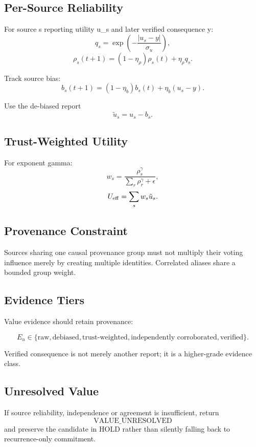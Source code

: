 

\subsection{Per-Source Reliability}

For source s reporting utility u_s and later verified consequence y:
\[
q_s = \exp\left(-\frac{|u_s-y|}{\sigma_u}\right),
\]
\[
\rho_s(t+1)
=
(1-\eta_\rho)\rho_s(t)
+
\eta_\rho q_s.
\]

Track source bias:
\[
b_s(t+1)
=
(1-\eta_b)b_s(t)
+
\eta_b(u_s-y).
\]

Use the de-biased report
\[
\tilde u_s=u_s-b_s.
\]

\subsection{Trust-Weighted Utility}

For exponent gamma:
\[
w_s
=
\frac{\rho_s^\gamma}
{\sum_r \rho_r^\gamma+\epsilon},
\]
\[
U_{\rm eff}
=
\sum_s w_s\tilde u_s.
\]

\subsection{Provenance Constraint}

Sources sharing one causal provenance group must not multiply their voting influence merely
by creating multiple identities. Correlated aliases share a bounded group weight.

\subsection{Evidence Tiers}

Value evidence should retain provenance:

\[
E_u \in
\{
\text{raw},
\text{debiased},
\text{trust-weighted},
\text{independently corroborated},
\text{verified}
\}.
\]

Verified consequence is not merely another report; it is a higher-grade evidence class.

\subsection{Unresolved Value}

If source reliability, independence or agreement is insufficient, return
\[
\boxed{\mathrm{VALUE\_UNRESOLVED}}
\]
and preserve the candidate in HOLD rather than silently falling back to recurrence-only commitment.
